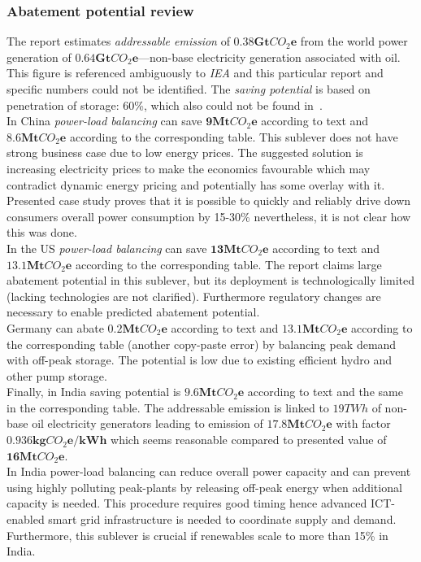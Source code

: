 \documentclass[11pt, twocolumn]{article}
\begin{document}
\subsubsection{Abatement potential review}
The report estimates \emph{addressable emission} of $\mathbf{0.38Gt}CO_2\mathbf{e}$ from the world power generation of $\mathbf{0.64Gt}CO_2\mathbf{e}$---non-base electricity generation associated with oil. This figure is referenced ambiguously to \emph{IEA} and this particular report and specific numbers could not be identified. The \emph{saving potential} is based on penetration of storage: 60\%, which also could not be found in~\citep{pieper2011revisiting}.\\

In China \emph{power-load balancing} can save $\mathbf{9} \mathbf{Mt}CO_2\mathbf{e}$ according to text and $\mathbf{8.6} \mathbf{Mt}CO_2\mathbf{e}$ according to the corresponding table. This sublever does not have strong business case due to low energy prices. The suggested solution is increasing electricity prices to make the economics favourable which may contradict dynamic energy pricing and potentially has some overlay with it. Presented case study proves that it is possible to quickly and reliably drive down consumers overall power consumption by 15-30\% nevertheless, it is not clear how this was done.\\

In the US \emph{power-load balancing} can save $\mathbf{13} \mathbf{Mt}CO_2\mathbf{e}$ according to text and $\mathbf{13.1} \mathbf{Mt}CO_2\mathbf{e}$ according to the corresponding table. The report claims large abatement potential in this sublever, but its deployment is technologically limited (lacking technologies are not clarified). Furthermore regulatory changes are necessary to enable predicted abatement potential.\\

Germany can abate $\mathbf{0.2} \mathbf{Mt}CO_2\mathbf{e}$ according to text and $\mathbf{13.1} \mathbf{Mt}CO_2\mathbf{e}$ according to the corresponding table (another copy-paste error) by balancing peak demand with off-peak storage. The potential is low due to existing efficient hydro and other pump storage.\\

Finally, in India saving potential is $\mathbf{9.6} \mathbf{Mt}CO_2\mathbf{e}$ according to text and the same in the corresponding table. The addressable emission is linked to $19TWh$ of non-base oil electricity generators leading to emission of $\mathbf{17.8} \mathbf{Mt}CO_2\mathbf{e}$ with factor $\mathbf{0.936 kg}CO_2\mathbf{e}/\mathbf{kWh}$ which seems reasonable compared to presented value of $\mathbf{16} \mathbf{Mt}CO_2\mathbf{e}$.\\
In India power-load balancing can reduce overall power capacity and can prevent using highly polluting peak-plants by releasing off-peak energy when additional capacity is needed. This procedure requires good timing hence advanced ICT-enabled smart grid infrastructure is needed to coordinate supply and demand. Furthermore, this sublever is crucial if renewables scale to more than 15\% in India.\\
\end{document}
